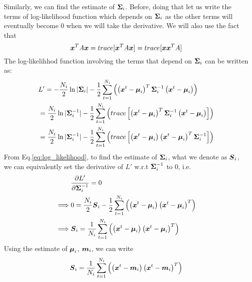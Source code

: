 Similarly, we can find the estimate of $\boldsymbol{\Sigma}_i$. Before, doing that let us write the terms of log-likelihood function which depends on $\boldsymbol{\Sigma}_i$ as the other terms will eventually become 0 when we will take the derivative. We will also use the fact that
\begin{equation*}
	\boldsymbol{x}^T A \boldsymbol{x} = trace[\boldsymbol{x}^T A \boldsymbol{x}] = trace[\boldsymbol{x} \boldsymbol{x}^T A]
\end{equation*} 
The log-likelihhod function involving the terms that depend on $\boldsymbol{\Sigma}_i$ can be written as:
\begin{equation}
	\begin{split}
		&L' = - \frac{N_i}{2}\ln|\boldsymbol{\Sigma}_i| -\frac{1}{2}\sum_{t=1}^{N_i}\left(\left(\boldsymbol{x}^t-\boldsymbol{\mu}_i\right)^T\boldsymbol{\Sigma}_i^{-1}\left(\boldsymbol{x}^t - \boldsymbol{\mu}_i\right)\right)\\
		&= \frac{N_i}{2}\ln|\boldsymbol{\Sigma}_i^{-1}| -\frac{1}{2}\sum_{t=1}^{N_i}\left(trace\left[\left(\boldsymbol{x}^t-\boldsymbol{\mu}_i\right)^T\boldsymbol{\Sigma}_i^{-1}\left(\boldsymbol{x}^t - \boldsymbol{\mu}_i\right)\right]\right)\\
		&= \frac{N_i}{2}\ln|\boldsymbol{\Sigma}_i^{-1}| -\frac{1}{2}\sum_{t=1}^{N_i}\left(trace\left[\left(\boldsymbol{x}^t - \boldsymbol{\mu}_i\right)\left(\boldsymbol{x}^t-\boldsymbol{\mu}_i\right)^T\boldsymbol{\Sigma}_i^{-1}\right]\right)\\
	\end{split}
\end{equation}
From Eq.\ref{eq:log_likelihood}, to find the estimate of $\boldsymbol{\Sigma}_i$, what we denote as $\boldsymbol{S}_i$, we can equivalently set the derivative of $L'$ w.r.t $\boldsymbol{\Sigma}_i^{-1}$ to 0, i.e.
\begin{equation}
	\begin{split}
		&\frac{\partial L'}{\partial \boldsymbol{\Sigma}_i^{-1}} = 0\\
		\implies & 0 = \frac{N_i}{2}\boldsymbol{S}_i - \frac{1}{2}\sum_{t=1}^{N_i}\left(\left(\boldsymbol{x}^t - \boldsymbol{\mu}_i\right)\left(\boldsymbol{x}^t-\boldsymbol{\mu}_i\right)^T\right)\\
		\implies & \boldsymbol{S}_i = \frac{1}{N_i}\sum_{t=1}^{N_i}\left(\left(\boldsymbol{x}^t - \boldsymbol{\mu}_i\right)\left(\boldsymbol{x}^t-\boldsymbol{\mu}_i\right)^T\right)\\
	\end{split}
\end{equation}
Using the estimate of $\boldsymbol{\mu}_i$, $\boldsymbol{m}_i$, we can write
\begin{equation}\label{eq:mle_cov}
	\boldsymbol{S}_i = \frac{1}{N_i}\sum_{t=1}^{N_i}\left(\left(\boldsymbol{x}^t - \boldsymbol{m}_i\right)\left(\boldsymbol{x}^t-\boldsymbol{m}_i\right)^T\right)
\end{equation}
